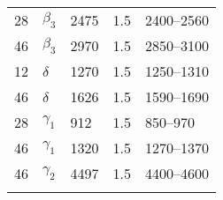 \begin{center}
{\begin{tabular}[!h]{lllll}
28              & $\beta_3$ & 2475                  & 1.5           & 2400--2560     \\
46              & $\beta_3$ & 2970                  & 1.5           & 2850--3100     \\
12              & $\delta$  & 1270                  & 1.5           & 1250--1310     \\
46              & $\delta$  & 1626                  & 1.5           & 1590--1690     \\
28              & $\gamma_1$& 912                   & 1.5           & 850--970       \\
46              & $\gamma_1$& 1320                  & 1.5           & 1270--1370     \\
46              & $\gamma_2$& 4497                  & 1.5           & 4400--4600     \\
\bottomrule

        \label{Table:Appendix:MicroFitParams}
        \end{tabular} }
    \end{center}
